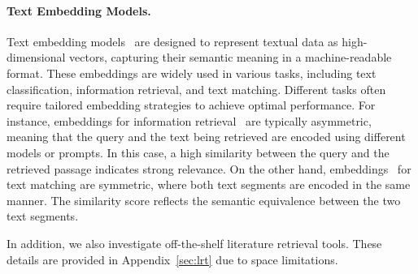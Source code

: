 \documentclass{article}
\theoremstyle{plain}
\theoremstyle{definition}
\theoremstyle{remark}
\begin{document}
\paragraph{Text Embedding Models.} Text embedding models~\citealp{DBLP:conf/emnlp/ReimersG19,DBLP:journals/corr/abs-2212-03533} are designed to represent textual data as high-dimensional vectors, capturing their semantic meaning in a machine-readable format. These embeddings are widely used in various tasks, including text classification, information retrieval, and text matching. Different tasks often require tailored embedding strategies to achieve optimal performance.
For instance, embeddings for information retrieval~\citep{DBLP:journals/corr/abs-2405-17428,DBLP:journals/corr/abs-2409-10173,DBLP:journals/corr/abs-2402-03216,DBLP:conf/emnlp/ZhangZLXDTLYXHZ24,DBLP:journals/corr/abs-2201-10005} are typically asymmetric, meaning that the query and the text being retrieved are encoded using different models or prompts. In this case, a high similarity between the query and the retrieved passage indicates strong relevance. On the other hand, embeddings~\citep{DBLP:conf/emnlp/ReimersG19,DBLP:journals/corr/abs-2409-10173,DBLP:journals/corr/abs-2201-10005} for text matching are symmetric, where both text segments are encoded in the same manner. The similarity score reflects the semantic equivalence between the two text segments.

In addition, we also investigate off-the-shelf literature retrieval tools. These details are provided in Appendix~\ref{sec:lrt} due to space limitations.
\end{document}
